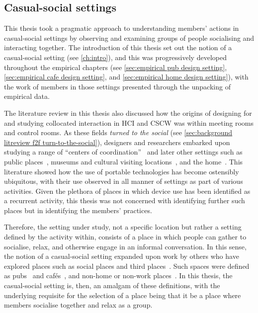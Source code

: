 \subsection{Casual-social settings}\label{sec:synopsis discussion conduct settings}
\begin{revisedsubmission}
This thesis took a pragmatic approach to understanding members' actions in casual-social settings by observing and examining groups of people socialising and interacting together.
The introduction of this thesis set out the notion of a casual-social setting (see \autoref{ch:intro}), and this was progressively developed throughout the empirical chapters (see \ref{sec:empirical pub design setting}, \ref{sec:empirical cafe design setting}, and \ref{sec:empirical home design setting}), with the work of members in those settings presented through the unpacking of empirical data.

The literature review in this thesis also discussed how the origins of designing for and studying collocated interaction in \ac{HCI} and \ac{CSCW} was within meeting rooms and control rooms.
As these fields \textit{turned to the social} (see \ref{sec:background litreview f2f turn-to-the-social}), designers and researchers embarked upon studying a range of ``centers of coordination''~\citep{Suchman1997} and later other settings such as public places~\citep{Weilenmann2002}, museums and cultural visiting locations~\citep{Ciolfi2003,Fosh2013}, and the home~\citep{Rooksby2015,Ferdous2016}.
This literature showed how the use of portable technologies has become ostensibly ubiquitous, with their use observed in all manner of settings as part of various activities.
Given the plethora of places in which device use has been identified as a recurrent activity, this thesis was not concerned with identifying further such places but in identifying the members' practices.%

Therefore, the setting under study, not a specific location but rather a setting defined by the activity within, consists of a place in which people can gather to socialise, relax, and otherwise engage in an informal conversation. 
In this sense, the notion of a casual-social setting expanded upon work by others who have explored places such as social places and third places~\citep{Oldenburg1989}.
Such spaces were defined as pubs~\citep[pp. 88--108]{Fox2004} and caf\'{e}s~\citep{Laurier2008}, and non-home or non-work places~\citep{Oldenburg1989}.
In this thesis, the casual-social setting is, then, an amalgam of these definitions, with the underlying requisite for the selection of a place being that it be a place where members socialise together and relax as a group.


\end{revisedsubmission}
